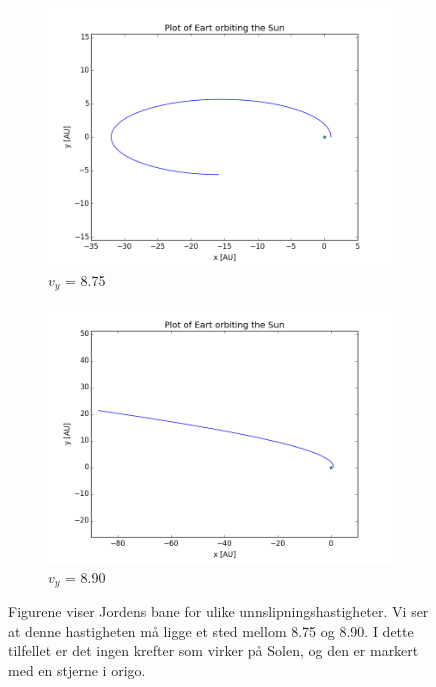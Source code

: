 \documentclass[11pt,a4paper]{article}
\begin{document}
\FloatBarrier
\begin{figure}[!ht]
\centering
\begin{subfigure}{.5\textwidth}
  \centering
  \includegraphics[width=1.1\linewidth]{3d_escape_v_8_75.png}
  \caption{$v_y$ = 8.75}
  \label{fig:sub1}
\end{subfigure}%
\begin{subfigure}{.5\textwidth}
  \centering
  \includegraphics[width=1.1\linewidth]{3d_escape_v_8_9.png}
  \caption{$v_y$ = 8.90}
  \label{fig:sub2}
\end{subfigure}
\caption{Figurene viser Jordens bane for ulike unnslipningshastigheter. Vi ser at denne hastigheten må ligge et sted mellom 8.75 og 8.90. I dette tilfellet er det ingen krefter som virker på Solen, og den er markert med en stjerne i origo.}
\label{fig:uh}
\end{figure}
\FloatBarrier
\end{document}
